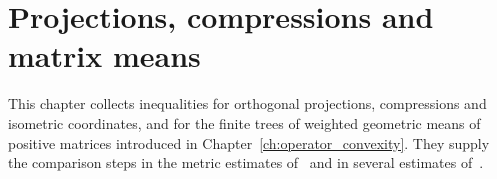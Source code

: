 \chapter{Projections, compressions and matrix means}
\label{ch:projections_and_means}

This chapter collects inequalities for orthogonal projections, compressions and
isometric coordinates, and for the finite trees of weighted geometric means of
positive matrices introduced in Chapter~\ref{ch:operator_convexity}. They
supply the comparison steps in the metric estimates
of~\cite[Section~8]{OpenAI2026AreaLaw} and in several estimates
of~\cite{OpenAI2026PolynomialPEPS}.
























